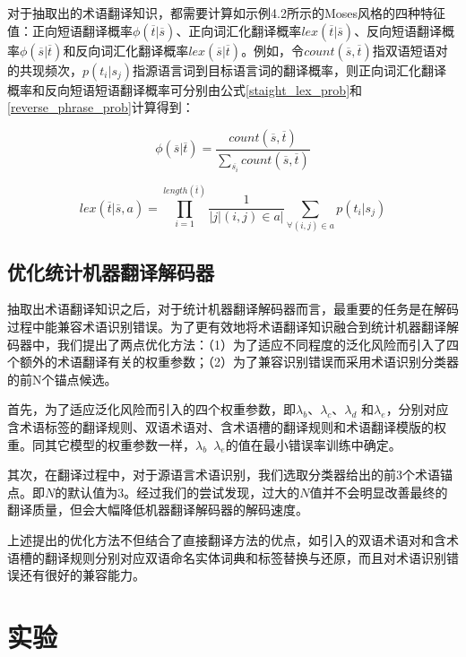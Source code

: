 对于抽取出的术语翻译知识，都需要计算如示例4.2所示的Moses风格的四种特征值：正向短语翻译概率$\phi (\overline{t}|\overline{s})$、正向词汇化翻译概率$lex(\overline{t}|\overline{s})$、反向短语翻译概率$\phi (\overline{s}|\overline{t})$和反向词汇化翻译概率$lex(\overline{s}|\overline{t})$。例如，令$count(\overline{s}, \overline{t})$指双语短语对的共现频次，$p(t_i|s_j)$指源语言词到目标语言词的翻译概率，则正向词汇化翻译概率和反向短语短语翻译概率可分别由公式\ref{staight_lex_prob}和\ref{reverse_phrase_prob}计算得到：

\begin{equation}\label{staight_lex_prob}
\phi (\overline{s}|\overline{t}) = \frac{count(\overline{s}, \overline{t})}{\sum_{\overline{s_i}} count(\overline{s}, \overline{t})}
\end{equation}

\begin{equation}\label{reverse_phrase_prob}
lex(\overline{t}|\overline{s}, a) = \prod_{i=1}^{length(\overline{t})} \frac{1}{|j|(i,j) \in a|} \sum_{\forall (i,j) \in a} p(t_i|s_j)
\end{equation}

\subsection{优化统计机器翻译解码器}

抽取出术语翻译知识之后，对于统计机器翻译解码器而言，最重要的任务是在解码过程中能兼容术语识别错误。为了更有效地将术语翻译知识融合到统计机器翻译解码器中，我们提出了两点优化方法：（1）为了适应不同程度的泛化风险而引入了四个额外的术语翻译有关的权重参数；（2）为了兼容识别错误而采用术语识别分类器的前N个锚点候选。

首先，为了适应泛化风险而引入的四个权重参数，即$\lambda_b$、$\lambda_c$、$\lambda_d$ 和$\lambda_e$，分别对应含术语标签的翻译规则、双语术语对、含术语槽的翻译规则和术语翻译模版的权重。同其它模型的权重参数一样，$\lambda_b$~$\lambda_e$的值在最小错误率训练中确定。

其次，在翻译过程中，对于源语言术语识别，我们选取分类器给出的前3个术语锚点。即$N$的默认值为3。经过我们的尝试发现，过大的$N$值并不会明显改善最终的翻译质量，但会大幅降低机器翻译解码器的解码速度。

上述提出的优化方法不但结合了直接翻译方法的优点，如引入的双语术语对和含术语槽的翻译规则分别对应双语命名实体词典和标签替换与还原，而且对术语识别错误还有很好的兼容能力。

\section{实验}

